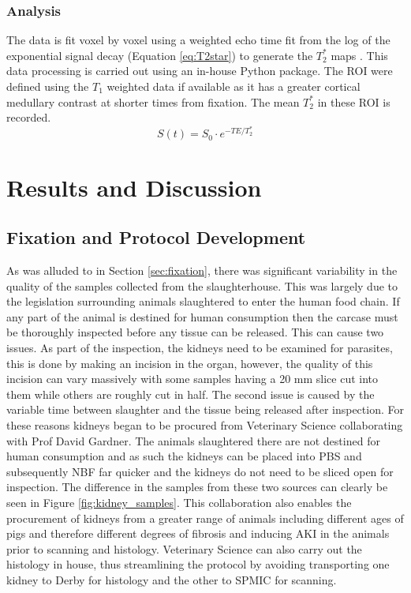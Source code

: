 \subsubsection{Analysis}
The data is fit voxel by voxel using a weighted echo time fit from the log of the exponential signal decay (Equation \eqref{eq:T2star}) to generate the $T_2^*$ maps \cite{cox_multiparametric_2017}. This data processing is carried out using an in-house Python package. The \ac{ROI} were defined using the $T_1$ weighted data if available as it has a greater cortical medullary contrast at shorter times from fixation. The mean $T_2^*$ in these \ac{ROI} is recorded.
\begin{equation}
S(t) = S_0 \cdot e^{-TE/T_2^*}
\label{eq:T2star}
\end{equation}

\newpage
\section{Results and Discussion}
\label{sec:neph_results}

\subsection{Fixation and Protocol Development}
As was alluded to in Section \ref{sec:fixation}, there was significant variability in the quality of the samples collected from the slaughterhouse. This was largely due to the legislation surrounding animals slaughtered to enter the human food chain. If any part of the animal is destined for human consumption then the carcase must be thoroughly inspected before any tissue can be released. This can cause two issues. As part of the inspection, the kidneys need to be examined for parasites, this is done by making an incision in the organ, however, the quality of this incision can vary massively with some samples having a 20 mm slice cut into them while others are roughly cut in half. The second issue is caused by the variable time between slaughter and the tissue being released after inspection. For these reasons kidneys began to be procured from Veterinary Science collaborating with Prof David Gardner. The animals slaughtered there are not destined for human consumption and as such the kidneys can be placed into \ac{PBS} and subsequently \ac{NBF} far quicker and the kidneys do not need to be sliced open for inspection. The difference in the samples from these two sources can clearly be seen in Figure \ref{fig:kidney_samples}. This collaboration also enables the procurement of kidneys from a greater range of animals including different ages of pigs and therefore different degrees of fibrosis and inducing \ac{AKI} in the animals prior to scanning and histology. Veterinary Science can also carry out the histology in house, thus streamlining the protocol by avoiding transporting one kidney to Derby for histology and the other to \ac{SPMIC} for scanning.

